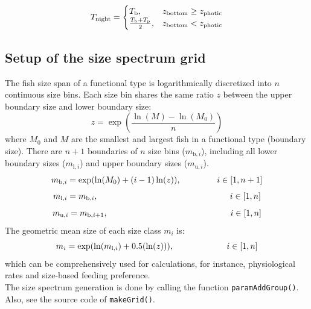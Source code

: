 \documentclass[
]{article}
\begin{document}
\begin{equation}
 T_{\mathrm{night}} =
  \begin{cases}
     T_{\mathrm{b}}, & \text{$ z_{\mathrm{bottom}} \geq z_{\mathrm{photic}} $}  \\
     \frac{T_{\mathrm{b}}+T_{\mathrm{p}}}{2}, & \text{$ z_{\mathrm{bottom}} < z_{\mathrm{photic}} $} 
  \end{cases}
\label{eq:xxxxxx3}
\end{equation}

\subsection{Setup of the size spectrum
grid}\label{setup-of-the-size-spectrum-grid}

The fish size span of a functional type is logarithmically discretized
into \(n\) continuous size bins. Each size bin shares the same ratio
\(z\) between the upper boundary size and lower boundary size:
\begin{equation}
z = \exp \left( \frac{\ln (M) - \ln (M_{0})}{n} \right)
\end{equation} where \(M_{0}\) and \(M\) are the smallest and largest
fish in a functional type (boundary size). There are \(n+1\) boundaries
of \(n\) size bins (\(m_{\mathrm{b},i}\)), including all lower boundary
sizes (\(m_{\mathrm{l},i}\)) and upper boundary sizes
(\(m_{\mathrm{u},i}\)). \begin{equation}
m_{\mathrm{b},i} =  \exp( \ln(M_{0}) + (i-1) \ln(z)), \hspace{1.5cm}  i\in[1,n+1]
\end{equation} \begin{equation}
m_{\mathrm{l},i} =  m_{\mathrm{b},i}, \hspace{5.5cm}  i\in[1,n]
\end{equation} \begin{equation}
m_{\mathrm{u},i} =  m_{\mathrm{b},i+1}, \hspace{5.1cm}  i\in[1,n]
\end{equation} The geometric mean size of each size class \(m_{i}\) is:
\begin{equation}
m_{i} =  \exp ( \ln(m_{\mathrm{l},i}) + 0.5(\ln(z)) ), \hspace{2.2cm}  i\in[1,n]
\end{equation} which can be comprehensively used for calculations, for
instance, physiological rates and size-based feeding preference.\\
The size spectrum generation is done by calling the function
\texttt{paramAddGroup()}. Also, see the source code of
\texttt{makeGrid()}.
\end{document}
